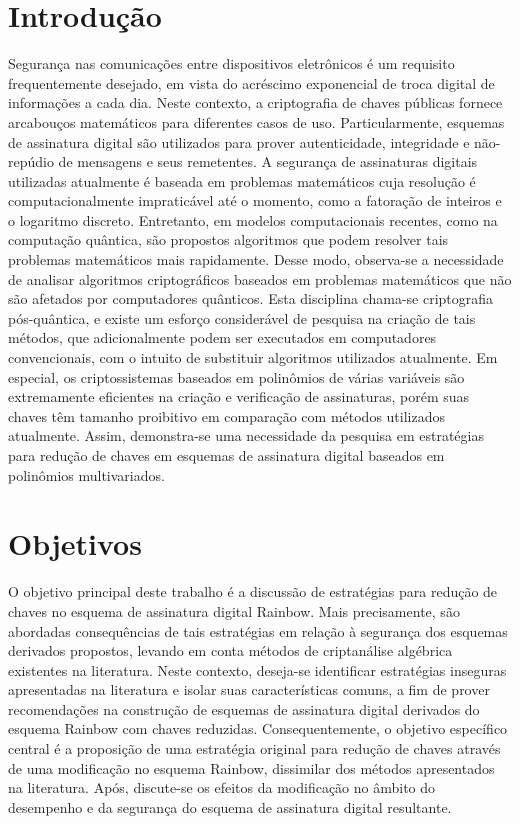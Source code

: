 \documentclass[english]{ufsc-thesis-rn46-2019/ufsc-thesis-rn46-2019}
\theoremstyle{definition}
\begin{document}
\begin{resumo}
  \section*{Introdução}
  Segurança nas comunicações entre dispositivos eletrônicos é um requisito
  frequentemente desejado, em vista do acréscimo exponencial de troca digital
  de informações a cada dia. Neste contexto, a criptografia de chaves públicas
  fornece arcabouços matemáticos para diferentes casos de uso. Particularmente,
  esquemas de assinatura digital são utilizados para prover autenticidade,
  integridade e não-repúdio de mensagens e seus remetentes. A segurança de
  assinaturas digitais utilizadas atualmente é baseada em problemas matemáticos
  cuja resolução é computacionalmente impraticável até o momento, como a
  fatoração de inteiros e o logaritmo discreto. Entretanto, em modelos
  computacionais recentes, como na computação quântica, são propostos
  algoritmos que podem resolver tais problemas matemáticos mais rapidamente.
  Desse modo, observa-se a necessidade de analisar algoritmos criptográficos
  baseados em problemas matemáticos que não são afetados por computadores
  quânticos. Esta disciplina chama-se criptografia pós-quântica, e existe um
  esforço considerável de pesquisa na criação de tais métodos, que
  adicionalmente podem ser executados em computadores convencionais, com o
  intuito de substituir algoritmos utilizados atualmente. Em especial, os
  criptossistemas baseados em polinômios de várias variáveis são extremamente
  eficientes na criação e verificação de assinaturas, porém suas chaves têm
  tamanho proibitivo em comparação com métodos utilizados atualmente. Assim,
  demonstra-se uma necessidade da pesquisa em estratégias para redução de
  chaves em esquemas de assinatura digital baseados em polinômios
  multivariados.

  \section*{Objetivos}
  O objetivo principal deste trabalho é a discussão de estratégias para redução
  de chaves no esquema de assinatura digital Rainbow. Mais precisamente, são
  abordadas consequências de tais estratégias em relação à segurança dos
  esquemas derivados propostos, levando em conta métodos de criptanálise
  algébrica existentes na literatura. Neste contexto, deseja-se identificar
  estratégias inseguras apresentadas na literatura e isolar suas
  características comuns, a fim de prover recomendações na construção de
  esquemas de assinatura digital derivados do esquema Rainbow com chaves
  reduzidas. Consequentemente, o objetivo específico central é a proposição de
  uma estratégia original para redução de chaves através de uma modificação no
  esquema Rainbow, dissimilar dos métodos apresentados na literatura. Após,
  discute-se os efeitos da modificação no âmbito do desempenho e da segurança
  do esquema de assinatura digital resultante.


\end{resumo}
\end{document}
